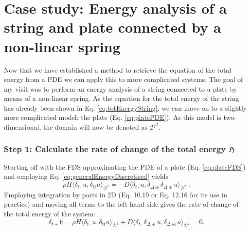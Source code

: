 \documentclass{article}
\begin{document}
\section{Case study: Energy analysis of a string and plate connected by a non-linear spring}
Now that we have established a method to retrieve the equation of the total energy from a PDE we can apply this to more complicated systems. The goal of my visit was to perform an energy analysis of a string connected to a plate by means of a non-linear spring. As the equation for the total energy of the string has already been shown in Eq. \eqref{eq:totEnergyString}, we can move on to a slightly more complicated model: the plate (Eq. \eqref{eq:platePDE}). As this model is two-dimensional, the domain will now be denoted as $\mathcal{D}^2$. 
\subsubsection*{Step 1: Calculate the rate of change of the total energy $\mathfrak{H}$}
Starting off with the FDS approximating the PDE of a plate (Eq. \eqref{eq:plateFDS}) and employing Eq. \eqref{eq:generalEnergyDiscretised} yields
\begin{equation}
    \rho H \langle \delta_{t\cdot} u, \delta_{tt}u\rangle_{\mathcal{D}^2} = -D\langle\delta_{t\cdot}u,\delta_{\Delta\boxplus}\delta_{\Delta\boxplus}u\rangle_{\mathcal{D}^2}\ .
\end{equation}
Employing integration by parts in 2D (Eq. 10.19 or Eq. 12.16 for its use in practice) and moving all terms to the left hand side gives the rate of change of the total energy of the system:
\begin{equation}\label{eq:rateOfChangeEnergyPlate}
    \delta_{t+} \mathfrak{h} = \rho H \langle \delta_{t\cdot} u, \delta_{tt}u\rangle_{\mathcal{D}^2} + D\langle\delta_{t\cdot}\delta_{\Delta\boxplus}u,\delta_{\Delta\boxplus}u\rangle_{\mathcal{D}^2} = 0.
\end{equation}
\end{document}
